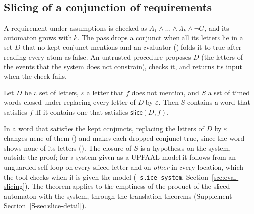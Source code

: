 \subsection{Slicing of a conjunction of requirements}
\label{sec:slicing}
A requirement under assumptions is checked as $A_1\wedge\dots\wedge A_k\wedge\neg G$, and its automaton grows with $k$. The pass  drops a conjunct when all its letters lie in a set $D$ that no kept conjunct mentions and an evaluator () folds it to true after reading every atom as false. An untrusted procedure proposes $D$ (the letters of the events that the system does not constrain),  checks it, and  returns its input when the check fails.

\begin{theorem}\label{thm:slice}
Let $D$ be a set of letters, $\varepsilon$ a letter that $f$ does not mention, and $S$ a set of timed words closed under replacing every letter of $D$ by $\varepsilon$. Then $S$ contains a word that satisfies $f$ iff it contains one that satisfies $\mathsf{slice}(D,f)$.
\end{theorem}
\noindent In a word that satisfies the kept conjuncts, replacing the letters of $D$ by $\varepsilon$ changes none of them () and makes each dropped conjunct true, since the word shows none of its letters (). The closure of $S$ is a hypothesis on the system, outside the proof; for a system given as a UPPAAL model it follows from an unguarded self-loop on every sliced letter and on \emph{other} in every location, which the tool checks when it is given the model (\texttt{-slice-system}, Section~\ref{sec:eval-slicing}). The theorem applies to the emptiness of the product of the sliced automaton with the system, through the translation theorems (Supplement Section~\ref{S-sec:slice-detail}).
